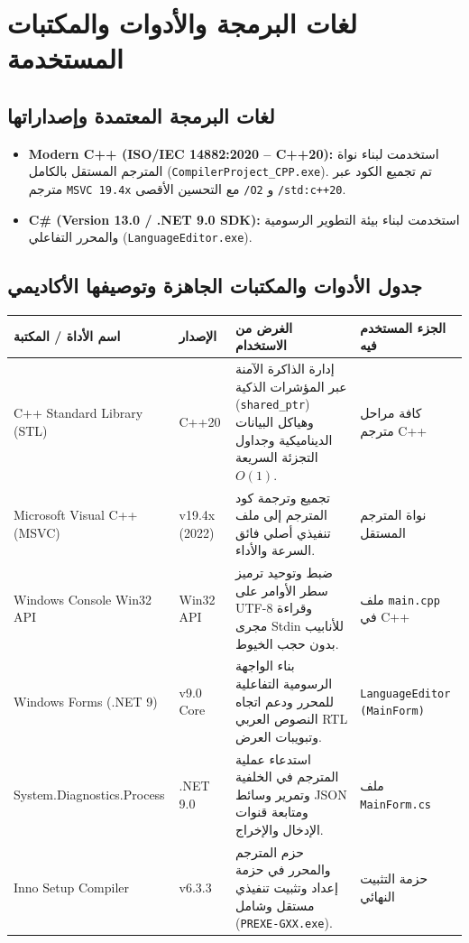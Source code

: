 \documentclass[11pt,a4paper,oneside]{report}
\begin{document}
\chapter{لغات البرمجة والأدوات والمكتبات المستخدمة}

\section{لغات البرمجة المعتمدة وإصداراتها}
\begin{itemize}
    \item \textbf{Modern C++ (ISO/IEC 14882:2020 -- C++20):} استخدمت لبناء نواة المترجم المستقل بالكامل (\texttt{CompilerProject\_CPP.exe}). تم تجميع الكود عبر مترجم \texttt{MSVC 19.4x} مع التحسين الأقصى \texttt{/O2} و \texttt{/std:c++20}.
    \item \textbf{C\# (Version 13.0 / .NET 9.0 SDK):} استخدمت لبناء بيئة التطوير الرسومية والمحرر التفاعلي (\texttt{LanguageEditor.exe}).
\end{itemize}

\section{جدول الأدوات والمكتبات الجاهزة وتوصيفها الأكاديمي}
\begin{longtable}{|p{4.2cm}|p{2.2cm}|p{6.8cm}|p{3.2cm}|}
\hline
\rowcolor{NavyBlue}\color{white}\textbf{\arabicfont اسم الأداة / المكتبة} & \rowcolor{NavyBlue}\color{white}\textbf{\arabicfont الإصدار} & \rowcolor{NavyBlue}\color{white}\textbf{\arabicfont الغرض من الاستخدام} & \rowcolor{NavyBlue}\color{white}\textbf{\arabicfont الجزء المستخدم فيه} \\
\hline
\endhead
C++ Standard Library (STL) & C++20 & إدارة الذاكرة الآمنة عبر المؤشرات الذكية (\texttt{shared\_ptr}) وهياكل البيانات الديناميكية وجداول التجزئة السريعة $O(1)$. & كافة مراحل مترجم C++ \\
\hline
Microsoft Visual C++ (MSVC) & v19.4x (2022) & تجميع وترجمة كود المترجم إلى ملف تنفيذي أصلي فائق السرعة والأداء. & نواة المترجم المستقل \\
\hline
Windows Console Win32 API & Win32 API & ضبط وتوحيد ترميز سطر الأوامر على UTF-8 وقراءة مجرى Stdin للأنابيب بدون حجب الخيوط. & ملف \texttt{main.cpp} في C++ \\
\hline
Windows Forms (.NET 9) & v9.0 Core & بناء الواجهة الرسومية التفاعلية للمحرر ودعم اتجاه النصوص العربي RTL وتبويبات العرض. & \texttt{LanguageEditor (MainForm)} \\
\hline
System.Diagnostics.Process & .NET 9.0 & استدعاء عملية المترجم في الخلفية وتمرير وسائط JSON ومتابعة قنوات الإدخال والإخراج. & ملف \texttt{MainForm.cs} \\
\hline
Inno Setup Compiler & v6.3.3 & حزم المترجم والمحرر في حزمة إعداد وتثبيت تنفيذي مستقل وشامل (\texttt{PREXE-GXX.exe}). & حزمة التثبيت النهائي \\
\hline
\end{longtable}
\end{document}
